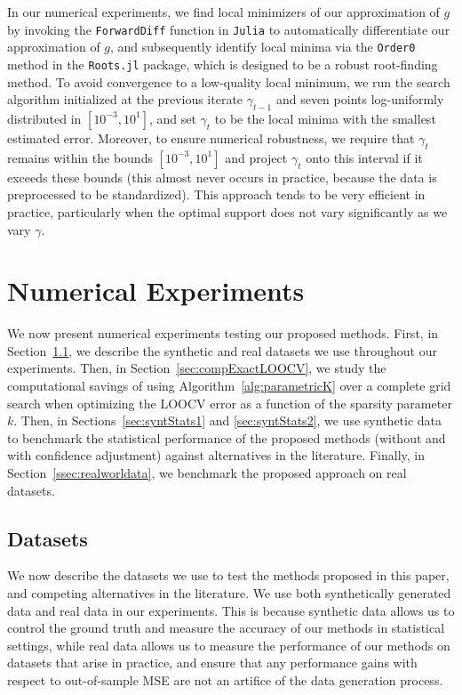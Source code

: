 \documentclass[opre,nonblindrev]{informs3} %
\begin{document}
In our numerical experiments, we find local minimizers of our approximation of $g$ by invoking the \verb|ForwardDiff| function in \verb|Julia| to automatically differentiate our approximation of $g$, and subsequently identify local minima via the \verb|Order0| method in the \verb|Roots.jl| package, which is designed to be a robust root-finding method. To avoid convergence to a low-quality local minimum, we run the search algorithm initialized at the previous iterate $\gamma_{t-1}$ and seven points log-uniformly distributed in $[10^{-3}, 10^{1}]$, and set $\gamma_t$ to be the local minima with the smallest estimated error. Moreover, to ensure numerical robustness, we require that $\gamma_t$ remains within the bounds $[10^{-3}, 10^1]$ and project $\gamma_t$ onto this interval if it exceeds these bounds (this almost never occurs in practice, because the data is preprocessed to be standardized). This approach tends to be very efficient in practice, particularly when the optimal support does not vary significantly as we vary $\gamma$. 


\section{Numerical Experiments}\label{sec:numres} 

We now present numerical experiments testing our proposed methods. First, in Section~\ref{sec:datasets}, we describe the synthetic and real datasets we use throughout our experiments. Then, in Section~\ref{sec:compExactLOOCV}, we study the computational savings of using Algorithm~\ref{alg:parametricK} over a complete grid search when optimizing the LOOCV error as a function of the sparsity parameter $k$. Then, in Sections~\ref{sec:syntStats1} and \ref{sec:syntStats2}, we use synthetic data to benchmark the statistical performance of the proposed methods (without and with confidence adjustment) against alternatives in the literature. Finally, in Section~\ref{ssec:realworldata}, we benchmark the proposed approach on real datasets.

\subsection{Datasets}\label{sec:datasets}

We now describe the datasets we use to test the methods proposed in this paper, and competing alternatives in the literature. We use both synthetically generated data and real data in our experiments. This is because synthetic data allows us to control the ground truth and measure the accuracy of our methods in statistical settings, while real data allows us to measure the performance of our methods on datasets that arise in practice, and ensure that any performance gains with respect to out-of-sample MSE are not an artifice of the data generation process. 
\end{document}
